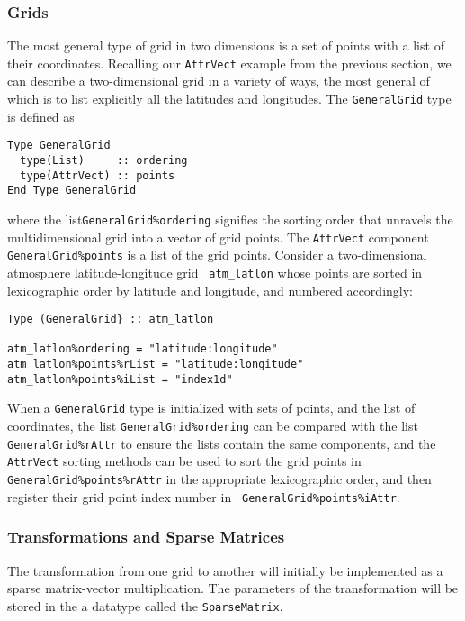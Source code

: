 \documentclass{article}
\begin{document}
\subsubsection{Grids}

The most general type of grid in two dimensions is a set of points
with a list of their coordinates.  Recalling our {\tt AttrVect}
example from the previous section, we can describe a
two-dimensional grid in a variety of ways, the most general of
which is to list explicitly all the latitudes and longitudes.  The
{\tt GeneralGrid} type is defined as
\begin{verbatim}
Type GeneralGrid
  type(List)     :: ordering
  type(AttrVect) :: points
End Type GeneralGrid
\end{verbatim}
where the list{\tt GeneralGrid\%ordering} signifies the sorting
order that unravels the multidimensional grid into a vector of
grid points.  The {\tt AttrVect} component {\tt
GeneralGrid\%points} is a list of the grid points.  Consider a
two-dimensional atmosphere latitude-longitude grid {\tt
atm\_latlon} whose points are sorted in lexicographic order by
latitude and longitude, and numbered accordingly:
\begin{verbatim}
Type (GeneralGrid} :: atm_latlon

atm_latlon%ordering = "latitude:longitude"
atm_latlon%points%rList = "latitude:longitude"
atm_latlon%points%iList = "index1d"

\end{verbatim}

When a {\tt GeneralGrid} type is initialized with sets of points,
and the list of coordinates, the list {\tt GeneralGrid\%ordering}
can be compared with the list {\tt GeneralGrid\%rAttr} to ensure
the lists contain the same components, and the {\tt AttrVect}
sorting methods can be used to sort the grid points in {\tt
GeneralGrid\%points\%rAttr} in the appropriate lexicographic
order, and then register their grid point index number in {\tt
GeneralGrid\%points\%iAttr}.

\subsubsection{Transformations and Sparse Matrices}

The transformation from one grid to another will initially be
implemented as a sparse matrix-vector multiplication.  The
parameters of the transformation will be stored in the a datatype
called the {\tt SparseMatrix}.
\end{document}
